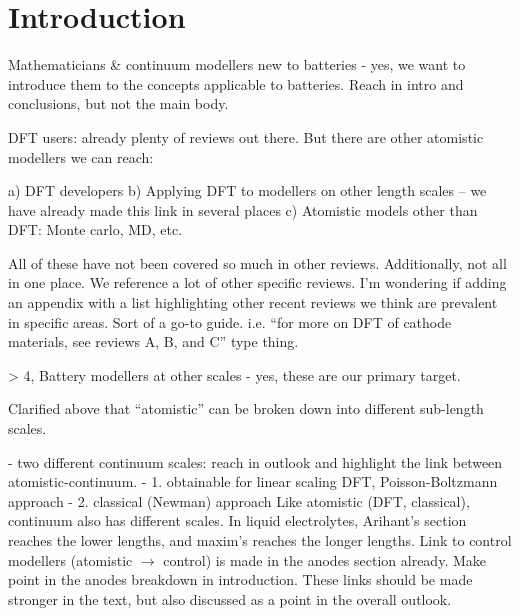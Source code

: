 \documentclass[../main.tex]{subfiles}
\begin{document}
\section{Introduction}
\label{sec:intro}





Mathematicians \& continuum modellers new to batteries - yes, we want to introduce them to the concepts applicable to batteries. Reach in intro and conclusions, but not the main body.

DFT users: already plenty of reviews out there. But there are other atomistic modellers we can reach:

a) DFT developers
b) Applying DFT to modellers on other length scales – we have already made this link in several places
c) Atomistic models other than DFT: Monte carlo, MD, etc.

All of these have not been covered so much in other reviews.
Additionally, not all in one place. We reference a lot of other specific reviews. I’m wondering if adding an appendix with a list highlighting other recent reviews we think are prevalent in specific areas. Sort of a go-to guide. i.e.  “for more on DFT of cathode materials, see reviews A, B, and C” type thing.

> 4, Battery modellers at other scales - yes, these are our primary target. 

Clarified above that “atomistic” can be broken down into different sub-length scales.

- two different continuum scales: reach in outlook and highlight the link between atomistic-continuum.
- 1. obtainable for linear scaling DFT, Poisson-Boltzmann approach
- 2. classical (Newman) approach
Like atomistic (DFT, classical), continuum also has different scales. In liquid electrolytes, Arihant’s section reaches the lower lengths, and maxim’s reaches the longer lengths.
Link to control modellers (atomistic $\to$ control) is made in the anodes section already. Make point in the anodes breakdown in introduction.
These links should be made stronger in the text, but also discussed as a point in the overall outlook.
\end{document}
